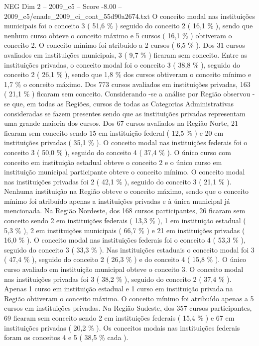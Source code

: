 \begin{textsample}{NEG Dim 2 – 2009\_c5 – Score -8.00 – 2009\_c5/enade\_2009\_ci\_cont\_55d90a2674.txt}
O conceito modal nas instituições municipais foi o conceito 3 ( 51,6 \% ) seguido do conceito 2 ( 16,1 \% ), sendo que nenhum curso obteve o conceito máximo e 5 cursos ( 16,1 \% ) obtiveram o conceito 2.
O conceito mínimo foi atribuído a 2 cursos ( 6,5 \% ).
Dos 31 cursos avaliados em instituições municipais, 3 ( 9,7 \% ) ficaram sem conceito.
Entre as instituições privadas, o conceito modal foi o conceito 3 ( 38,8 \% ), seguido do conceito 2 ( 26,1 \% ), sendo que 1,8 \% dos cursos obtiveram o conceito mínimo e 1,7 \% o conceito máximo.
Dos 773 cursos avaliados em instituições privadas, 163 ( 21,1 \% ) ficaram sem conceito.
Considerando -se a análise por Região observou -se que, em todas as Regiões, cursos de todas as Categorias Administrativas consideradas se fazem presentes sendo que as instituições privadas representam uma grande maioria dos cursos.
Dos 67 cursos avaliados na Região Norte, 21 ficaram sem conceito sendo 15 em instituição federal ( 12,5 \% ) e 20 em instituições privadas ( 35,1 \% ).
O conceito modal nas instituições federais foi o conceito 3 ( 50,0 \% ), seguido do conceito 4 ( 37,4 \% ).
O único curso com conceito em instituição estadual obteve o conceito 2 e o único curso em instituição municipal participante obteve o conceito mínimo.
O conceito modal nas instituições privadas foi 2 ( 42,1 \% ), seguido do conceito 3 ( 21,1 \% ).
Nenhuma instituição na Região obteve o conceito máximo, sendo que o conceito mínimo foi atribuído apenas a instituições privadas e à única municipal já mencionada.
Na Região Nordeste, dos 168 cursos participantes, 26 ficaram sem conceito sendo 2 em instituições federais ( 13,3 \% ), 1 em instituição estadual ( 5,3 \% ), 2 em instituições municipais ( 66,7 \% ) e 21 em instituições privadas ( 16,0 \% ).
O conceito modal nas instituições federais foi o conceito 4 ( 53,3 \% ), seguido do conceito 3 ( 33,3 \% ).
Nas instituições estaduais o conceito modal foi 3 ( 47,4 \% ), seguido do conceito 2 ( 26,3 \% ) e do conceito 4 ( 15,8 \% ).
O único curso avaliado em instituição municipal obteve o conceito 3.
O conceito modal nas instituições privadas foi 3 ( 38,2 \% ), seguido do conceito 2 ( 37,4 \% ).
Apenas 1 curso em instituição estadual e 1 curso em instituição privada na Região obtiveram o conceito máximo.
O conceito mínimo foi atribuído apenas a 5 cursos em instituições privadas.
Na Região Sudeste, dos 357 cursos participantes, 69 ficaram sem conceito sendo 2 em instituições federais ( 15,4 \% ) e 67 em instituições privadas ( 20,2 \% ).
Os conceitos modais nas instituições federais foram os conceitos 4 e 5 ( 38,5 \% cada ).

\end{textsample}
